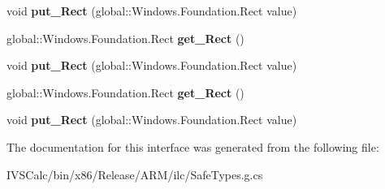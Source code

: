 \begin{DoxyCompactItemize}
\mbox{\label{interface_windows_1_1_u_i_1_1_xaml_1_1_media_1_1_i_rectangle_geometry_ad76506b912562159564afd0409fe2572}} 
void {\bfseries put\+\_\+\+Rect} (global\+::\+Windows.\+Foundation.\+Rect value)
\item 
\mbox{\label{interface_windows_1_1_u_i_1_1_xaml_1_1_media_1_1_i_rectangle_geometry_a0f7b043b0ee06c706ac2dd2b55e3811c}} 
global\+::\+Windows.\+Foundation.\+Rect {\bfseries get\+\_\+\+Rect} ()
\item 
\mbox{\label{interface_windows_1_1_u_i_1_1_xaml_1_1_media_1_1_i_rectangle_geometry_ad76506b912562159564afd0409fe2572}} 
void {\bfseries put\+\_\+\+Rect} (global\+::\+Windows.\+Foundation.\+Rect value)
\item 
\mbox{\label{interface_windows_1_1_u_i_1_1_xaml_1_1_media_1_1_i_rectangle_geometry_a0f7b043b0ee06c706ac2dd2b55e3811c}} 
global\+::\+Windows.\+Foundation.\+Rect {\bfseries get\+\_\+\+Rect} ()
\item 
\mbox{\label{interface_windows_1_1_u_i_1_1_xaml_1_1_media_1_1_i_rectangle_geometry_ad76506b912562159564afd0409fe2572}} 
void {\bfseries put\+\_\+\+Rect} (global\+::\+Windows.\+Foundation.\+Rect value)
\end{DoxyCompactItemize}


The documentation for this interface was generated from the following file\+:\begin{DoxyCompactItemize}
\item 
I\+V\+S\+Calc/bin/x86/\+Release/\+A\+R\+M/ilc/Safe\+Types.\+g.\+cs\end{DoxyCompactItemize}
